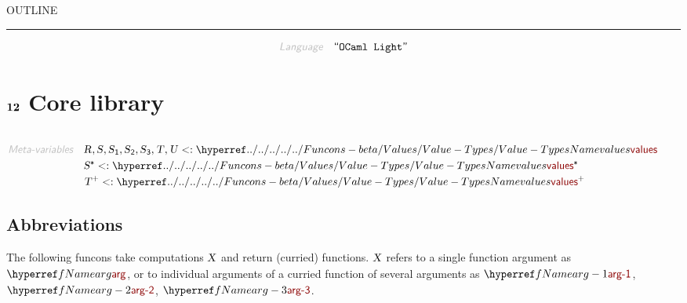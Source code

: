 


    OUTLINE
  \tableofcontents
\begin{center}
\rule{3in}{0.4pt}
\end{center}

\begin{displaymath}
\KEY{Language} \quad \STRING{OCaml Light}
\end{displaymath}

\section{$\SECT{12}$ Core library}\hypertarget{sect12-core-library}{}\label{sect12-core-library}

\begin{align*}
  [ \
  \KEY{Funcon} \quad & \NAMEREF{ocaml-light-core-library} \\
  \KEY{Funcon} \quad & \NAMEREF{ocaml-light-match-failure} \\
  \KEY{Funcon} \quad & \NAMEREF{ocaml-light-is-structurally-equal} \\
  \KEY{Funcon} \quad & \NAMEREF{ocaml-light-to-string} \\
  \KEY{Funcon} \quad & \NAMEREF{ocaml-light-define-and-display} \\
  \KEY{Funcon} \quad & \NAMEREF{ocaml-light-evaluate-and-display}
  \ ]
\end{align*}
\begin{align*}
  \KEY{Meta-variables} \quad
  & \VAR{R}, \VAR{S}, \VAR{S}\SUB{1}, \VAR{S}\SUB{2}, \VAR{S}\SUB{3}, \VAR{T}, \VAR{U} <: \NAMEHYPER{../../../../../Funcons-beta/Values}{Value-Types}{values} \qquad \\& \VAR{S}\STAR <: \NAMEHYPER{../../../../../Funcons-beta/Values}{Value-Types}{values}\STAR \qquad \\& \VAR{T}\PLUS <: \NAMEHYPER{../../../../../Funcons-beta/Values}{Value-Types}{values}\PLUS
\end{align*}
\subsection{Abbreviations}\hypertarget{abbreviations}{}\label{abbreviations}

The following funcons take computations $\SHADE{\VAR{X}}$ and return (curried) functions.
  $\SHADE{\VAR{X}}$ refers to a single function argument as $\SHADE{\NAMEREF{arg}}$, or to individual arguments
  of a curried function of several arguments as $\SHADE{\NAMEREF{arg-1}}$, $\SHADE{\NAMEREF{arg-2}}$, $\SHADE{\NAMEREF{arg-3}}$.

